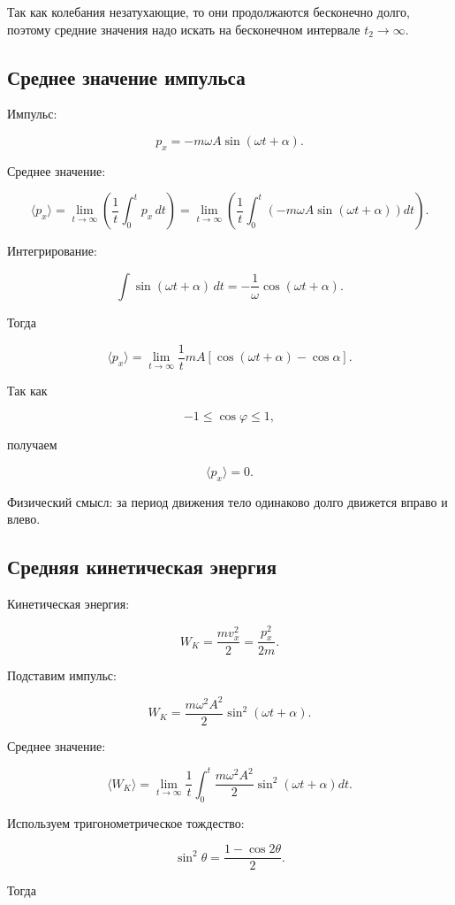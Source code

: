 \documentclass[a4paper,12pt]{article}
\begin{document}
Так как колебания незатухающие, то они продолжаются бесконечно долго, поэтому средние значения надо искать на бесконечном интервале $t_2 \to \infty$.

\subsection*{Среднее значение импульса}

Импульс:

\[
p_x = - m \omega A \sin(\omega t + \alpha).
\]

Среднее значение:

\[
\langle p_x \rangle
=
\lim_{t \to \infty}
\left(
\frac{1}{t}
\int_0^t p_x \, dt
\right)
=
\lim_{t \to \infty}
\left(
\frac{1}{t}
\int_0^t
(- m \omega A \sin(\omega t + \alpha))
dt
\right).
\]

Интегрирование:

\[
\int \sin(\omega t + \alpha)\,dt
=
-\frac{1}{\omega}
\cos(\omega t + \alpha).
\]

Тогда

\[
\langle p_x \rangle
=
\lim_{t \to \infty}
\frac{1}{t}
m A
\left[
\cos(\omega t + \alpha)
-
\cos \alpha
\right].
\]

Так как

\[
-1 \le \cos \varphi \le 1,
\]

получаем

\[
\langle p_x \rangle = 0.
\]

Физический смысл: за период движения тело одинаково долго движется вправо и влево.

\subsection*{Средняя кинетическая энергия}

Кинетическая энергия:

\[
W_K
=
\frac{m v_x^2}{2}
=
\frac{p_x^2}{2m}.
\]

Подставим импульс:

\[
W_K
=
\frac{m \omega^2 A^2}{2}
\sin^2(\omega t + \alpha).
\]

Среднее значение:

\[
\langle W_K \rangle
=
\lim_{t \to \infty}
\frac{1}{t}
\int_0^t
\frac{m \omega^2 A^2}{2}
\sin^2(\omega t + \alpha)
dt.
\]

Используем тригонометрическое тождество:

\[
\sin^2 \theta
=
\frac{1 - \cos 2\theta}{2}.
\]

Тогда
\end{document}
